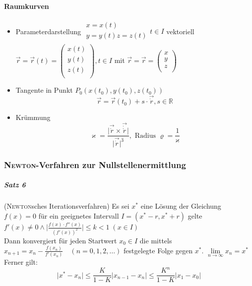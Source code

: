 \documentclass[a4paper]{scrartcl}
\begin{document}
\paragraph{Raumkurven}
\begin{itemize}
\item Parameterdarstellung $\begin{array}{c} x=x(t)\\ y= y(t) z = z(t)\\ \end{array} t \in I$ vektoriell $\vec{r} = \vec{r} (t) = \begin{pmatrix} x(t) \\ y(t) \\ z(t) \\ \end{pmatrix}, t \in I$ mit $\vec{r} = \vec{r} = \begin{pmatrix} x \\ y \\ z \\ \end{pmatrix}$
\item Tangente in Punkt $P_0 (x(t_0),y(t_0),z(t_0))$
\[ \vec{r} = \vec{r} (t_0) + s \cdot \vec{\dot{r}}, s \in \mathbb{R}\]
\item Krümmung
\[ \varkappa = \frac{\lvert \vec{\dot{r}} \times \vec{\dot{\dot{r}}} \rvert}{\lvert \vec{\dot{r}} \rvert^3}, \text{ Radius } \varrho = \frac{1}{\varkappa} \]
\end{itemize}

\subsubsection{\textsc{Newton}-Verfahren zur Nullstellenermittlung}
\subparagraph{Satz 6} (\textsc{Newton}sches Iterationsverfahren)
Es sei $x^*$ eine Lösung der Gleichung $f(x) = 0$ für ein geeignetes Intervall $I=(x^*-r,x^*+r)$ gelte $f'(x) \neq 0 \wedge \lvert \frac{f(x) \cdot f''(x)}{(f'(x))^2} \rvert \leq k < 1 \; (x \in I)$\\
Dann konvergiert für jeden Startwert $x_0 \in I$ die mittels $x_{n+1} = x_n - \frac{f(x_n)}{f'(x_n)} \quad (n=0,1,2,\dots)$ festgelegte Folge gegen $x^*$. $\lim\limits_{n \to \infty} x_n = x^*$\\
Ferner gilt:
\[\lvert x^* -x_n \rvert \leq  \frac{K}{1-K} \lvert x_{n-1} - x_n \rvert \leq \frac{K^n}{1-K} \lvert x_1 - x_0 \rvert \]
\end{document}
